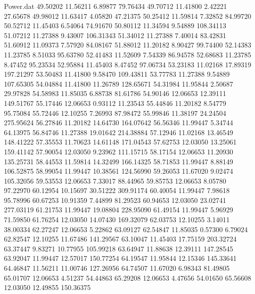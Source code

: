 \begin{filecontents}{Power.dat}
  49.50202   11.56211    6.89877   79.76434
  49.70712   11.41800    2.42221   27.65678
  49.98012   11.63417    4.05820   47.21375
  50.25412   11.59814    7.32852   84.99720
  50.52712   11.45403    6.54064   74.91670
  50.80112   11.34594    9.54889  108.34113
  51.07212   11.27388    9.43007  106.31343
  51.34012   11.27388    7.40014   83.42831
  51.60912   11.09373    7.57920   84.08167
  51.88012   11.20182    8.90427   99.74400
  52.14383   11.23785    8.51033   95.63780
  52.41483   11.52609    7.54339   86.94578
  52.68683   11.23785    8.47452   95.23534
  52.95884   11.45403    8.47452   97.06734
  53.23183   11.02168   17.89319  197.21297
  53.50483   11.41800    9.58470  109.43811
  53.77783   11.27388    9.54889  107.65305
  54.04884   11.41800   11.26789  128.65671
  54.31984   11.95844    2.50687   29.97828
  54.58983   11.85035    6.88738   81.61786
  54.90146   12.06653   12.39111  149.51767
  55.17446   12.06653    0.93112   11.23543
  55.44846   11.20182    8.54779   95.75084
  55.72446   12.10255    7.26993   87.98472
  55.99846   11.38197   24.24504  275.95624
  56.27846   11.20182   14.64730  164.07642
  56.56346   11.99447    5.34744   64.13975
  56.84746   11.27388   19.01642  214.38884
  57.12946   11.02168   13.46549  148.41222
  57.35553   11.70623   14.61148  171.04543
  57.62753   12.03050   13.25061  159.41142
  57.90054   12.03050    9.23962  111.15715
  58.17154   12.06653   11.20930  135.25731
  58.44553   11.59814   14.32499  166.14325
  58.71853   11.99447    8.88149  106.52875
  58.99054   11.99447   10.38561  124.56990
  59.26053   11.67020    9.02474  105.32056
  59.53553   12.06653    7.33017   88.44965
  59.85753   12.06653    8.05780   97.22970
  60.12954   10.15697   30.51222  309.91174
  60.40054   11.99447    7.98618   95.78996
  60.67253   10.91359    7.44899   81.29523
  60.94653   12.03050   23.02741  277.03119
  61.21753   11.99447   19.08804  228.95090
  61.49154   11.99447    5.96929   71.59850
  61.76254   12.03050   14.07430  169.32079
  62.03753   12.10255    3.14011   38.00334
  62.27247   12.06653    5.22862   63.09127
  62.54847   11.85035    0.57300    6.79024
  62.82547   12.10255   11.67486  141.29567
  63.10047   11.45403   17.75159  203.32724
  63.37447    9.83271   10.77955  105.99218
  63.64947   11.88638   12.39111  147.28545
  63.92047   11.99447   12.57017  150.77254
  64.19547   11.95844   12.15346  145.33641
  64.46847   11.56211   11.00746  127.26956
  64.74507   11.67020    6.98343   81.49805
  65.01707   12.06653    4.51237   54.44863
  65.29208   12.06653    4.47656   54.01650
  65.56608   12.03050   12.49855  150.36375

\end{filecontents}
